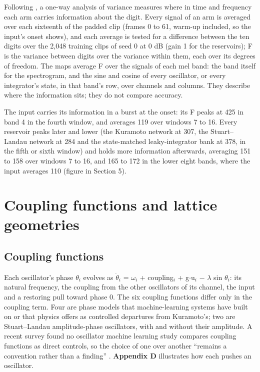 \documentclass[10pt]{article}
\makeatletter
\newcommand{\tmlr@floatbarrier}{\par\vspace{\z@}%
  \ifx\@deferlist\@empty\else\clearpage\fi}
\let\tmlr@section\section
\renewcommand{\section}{\tmlr@floatbarrier\tmlr@section}
\makeatother
\begin{document}
Following \citet{beoletto2026}, a one-way analysis of variance measures
where in time and frequency each arm carries information about the
digit. Every signal of an arm is averaged over each sixteenth of the
padded clip (frames 0 to 61, warm-up included, so the input's onset
shows), and each average is tested for a difference between the ten
digits over the 2,048 training clips of seed 0 at 0 dB (gain 1 for the
reservoirs); F is the variance between digits over the variance within
them, each over its degrees of freedom. The maps average F over the
signals of each mel band: the band itself for the spectrogram, and the
sine and cosine of every oscillator, or every integrator's state, in
that band's row, over channels and columns. They describe where the
information sits; they do not compare accuracy.

The input carries its information in a burst at the onset: its F peaks
at 425 in band 4 in the fourth window, and averages 119 over windows 7
to 16. Every reservoir peaks later and lower (the Kuramoto network at
307, the Stuart--Landau network at 284 and the state-matched
leaky-integrator bank at 378, in the fifth or sixth window) and holds
more information afterwards, averaging 151 to 158 over windows 7 to 16,
and 165 to 172 in the lower eight bands, where the input averages 110
(figure in Section 5).

\section{Coupling functions and lattice
geometries}\label{coupling-functions-and-lattice-geometries}

\subsection{Coupling functions}\label{coupling-functions-2}

Each oscillator's phase \ensuremath{\theta_{i}} evolves as
\ensuremath{\dot{\theta}_{i}} = \ensuremath{\omega_{i}} +
coupling\ensuremath{_{i}} + g\ensuremath{\cdot}u\ensuremath{_{i}}
\ensuremath{-} \ensuremath{\lambda} sin \ensuremath{\theta_{i}}: its
natural frequency, the coupling from the other oscillators of its
channel, the input and a restoring pull toward phase 0. The six coupling
functions differ only in the coupling term. Four are phase models that
machine-learning systems have built on or that physics offers as
controlled departures from Kuramoto's; two are Stuart--Landau
amplitude-phase oscillators, with and without their amplitude. A recent
survey found no oscillator machine learning study compares coupling
functions as direct controls, so the choice of one over another
``remains a convention rather than a finding'' \citep{kryski2026}.
\textbf{Appendix D} illustrates how each pushes an oscillator.
\end{document}
